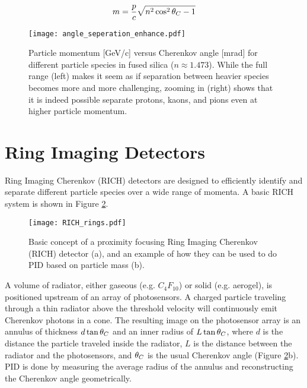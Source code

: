 \begin{equation}
	m = \frac{p}{c} \sqrt{n^2 \cos^2\theta_{C} - 1}
	\label{eq:mass}
\end{equation}

\begin{figure}[ht]
	\centering
	\texttt{[image: angle\_seperation\_enhance.pdf]}
	\caption{Particle momentum [GeV/c] versus Cherenkov angle [mrad] for different particle species in fused silica ($n \approx 1.473$). While the full range (left) makes it seem as if separation between heavier species becomes more and more challenging, zooming in (right) shows that it is indeed possible separate protons, kaons, and pions even at higher particle momentum.}
	\label{fig:angleseperation}
\end{figure}

\section{Ring Imaging Detectors}
Ring Imaging Cherenkov (RICH) detectors are designed to efficiently identify and separate different particle species over a wide range of momenta. A basic RICH system is shown in Figure \ref{fig:rich_basics}. 

\begin{figure}[ht]
	\centering
	\texttt{[image: RICH\_rings.pdf]}
	\caption{Basic concept of a proximity focusing Ring Imaging Cherenkov (RICH) detector (a), and an example of how they can be used to do PID based on particle mass (b).}
	\label{fig:rich_basics}
\end{figure}

A volume of radiator, either gaseous (e.g. $C_{4}F_{10}$) or solid (e.g. aerogel), is positioned upstream of an array of photosensors. A charged particle traveling through a thin radiator above the threshold velocity will continuously emit Cherenkov photons in a cone. The resulting image on the photosensor array is an annulus of thickness $d\tan\theta_{C}$ and an inner radius of $L\tan\theta_{C}$, where $d$ is the distance the particle traveled inside the radiator, $L$ is the distance between the radiator and the photosensors, and  $\theta_{C}$ is the usual Cherenkov angle (Figure \ref{fig:rich_basics}b). PID is done by measuring the average radius of the annulus and reconstructing the Cherenkov angle geometrically.


